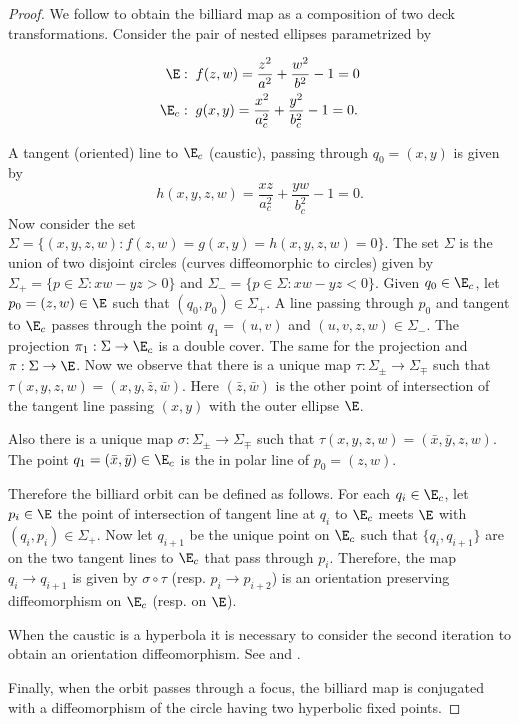  \begin{proof}
 We follow \cite{bry-2010} to obtain the billiard map as a composition of two deck transformations.  Consider the pair of nested   ellipses parametrized by
 
 \begin{align*}
     \E:&\;\; f(z,w)=\frac{z^2}{a^2}+\frac{w^2}{b^2}-1=0\\
     \E_c:&\;\; g(x,y)= \frac{x^2}{a_c^2}+\frac{y^2}{b_c^2}-1=0.
 \end{align*}
 
 A tangent (oriented) line to $\E_c$ (caustic), passing through $q_0=(x,y)$ is given by
 \[h(x,y,z,w) =\frac{xz}{a_c^2}+\frac{yw}{b_c^2}-1=0.\]
 Now consider the set
 $\Sigma= \{(x,y,z,w): f(z,w)=g(x,y)=h(x,y,z,w)=0\}.$  
 The set $\Sigma$ is the union of two disjoint circles (curves  diffeomorphic  to circles) given by
 $\Sigma_+=\{p\in \Sigma: xw-yz>0\} $ and
  $\Sigma_-=\{p\in \Sigma: xw-yz<0\}. $
  Given $q_0\in\E_c$, let $p_0=(z,w)\in \E$ such that $(q_0,p_0)\in\Sigma_+.$ A line passing through $p_0$ and tangent to $\E_c$ passes through the point $q_1=(u,v)$ and $(u,v,z,w)\in\Sigma_-.$ 
 The projection  $\pi_1:\Sigma \to \E_c$ is a double cover. The same for the projection
 and $\pi:\Sigma\to \E$. 
 Now we observe that there is a unique map $\tau:\Sigma_{\pm}\to \Sigma_{\mp}$ such that $\tau(x,y,z,w)=(x,y,\bar{z},\bar{w})$. Here $(\bar{z},\bar{w})$ is the other point of intersection of the tangent line passing $(x,y)$ with the outer ellipse $\E$.
 
Also there is a unique map $\sigma:\Sigma_{\pm}\to \Sigma_{\mp}$ such that $\tau(x,y,z,w)=( \bar{x},\bar{y},z,w)$. The point $q_1=( \bar{x},\bar{y})\in\E_c$ is the in polar line of $p_0=(z,w)$. 
 
 
 Therefore the billiard orbit can be defined as follows. For each $q_i\in \E_c$, let $p_i\in\E$ the point of intersection of tangent line at $q_i$ to $\E_c$ meets $\E$ with $(q_i,p_i)\in\Sigma_{+}$. Now let $q_{i+1}$ be the unique point on $\E_c$ such that $\{q_i,q_{i+1}\}$ are on the two tangent lines to $\E_c$ that pass through $p_i$. Therefore,   the map $q_i\to q_{i+1}$ is given by $\sigma\circ \tau$ (resp. $p_i\to p_{i+2}$) is an orientation preserving diffeomorphism on $\E_c$ (resp. on $\E$).

When the caustic is a hyperbola it is necessary to consider the second iteration to obtain an orientation diffeomorphism. See \cite{birkhoff1922} and \cite{kolod1985}.

Finally, when the orbit passes through a focus, the billiard map is conjugated with a diffeomorphism of the circle having two hyperbolic fixed points.
\end{proof}
 


